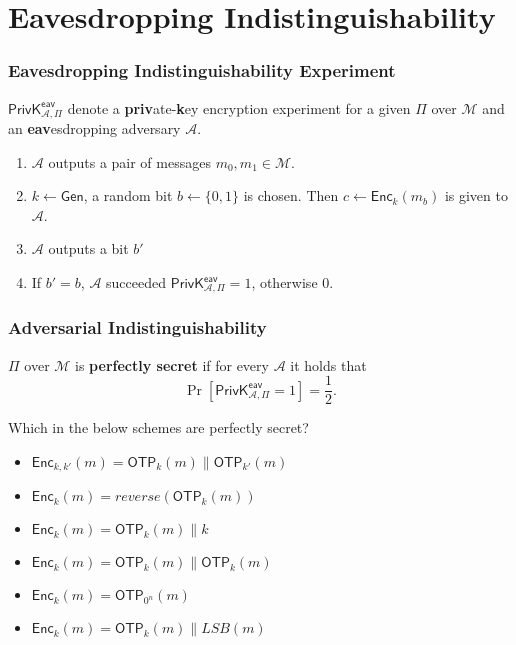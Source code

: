 \section{Eavesdropping Indistinguishability}
\begin{frame}\frametitle{Eavesdropping Indistinguishability Experiment}
$\mathsf{PrivK}^{\mathsf{eav}}_{\mathcal{A},\Pi}$ denote a \textbf{priv}ate-\textbf{k}ey encryption experiment for a given $\Pi$ over $\mathcal{M}$ and an \textbf{eav}esdropping adversary $\mathcal{A}$.
\begin{enumerate}
	\item $\mathcal{A}$ outputs a pair of messages $m_0, m_1 \in \mathcal{M}$.
	\item $k \gets \mathsf{Gen}$, a random bit $b \gets \{0,1\}$ is chosen. Then $c \gets \mathsf{Enc}_k(m_b)$ is given to $\mathcal{A}$.
	\item $\mathcal{A}$ outputs a bit $b'$
	\item If $b' = b$, $\mathcal{A}$ succeeded $\mathsf{PrivK}^{\mathsf{eav}}_{\mathcal{A},\Pi}=1$, otherwise 0.
\end{enumerate}
\begin{figure}
\begin{center}

\end{center}
\end{figure}
\end{frame}
\begin{frame}\frametitle{Adversarial Indistinguishability}
\begin{definition}
$\Pi$ over $\mathcal{M}$ is \textbf{perfectly secret} if for every $\mathcal{A}$ it holds that
\[ \Pr[\mathsf{PrivK}^{\mathsf{eav}}_{\mathcal{A},\Pi}=1] = \frac{1}{2}.\]
\end{definition}
\begin{exampleblock}{Which in the below schemes are perfectly secret?}
\begin{itemize}
\item $\mathsf{Enc}_{k,k'}(m)= \mathsf{OTP}_k(m) \| \mathsf{OTP}_{k'}(m)$
\item $\mathsf{Enc}_{k}(m)= reverse(\mathsf{OTP}_k(m))$
\item $\mathsf{Enc}_{k}(m)= \mathsf{OTP}_k(m) \| k$
\item $\mathsf{Enc}_{k}(m)= \mathsf{OTP}_k(m) \| \mathsf{OTP}_k(m) $
\item $\mathsf{Enc}_{k}(m)= \mathsf{OTP}_{0^{n}}(m)$
\item $\mathsf{Enc}_{k}(m)= \mathsf{OTP}_k(m) \| LSB(m)$
\end{itemize}
\end{exampleblock}
\end{frame}

